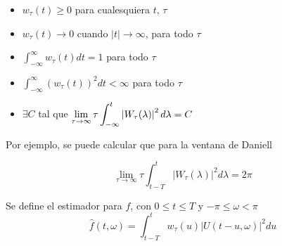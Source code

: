 \begin{itemize}
\item $w_{\tau}(t) \geq 0$ para cualesquiera $t$, $\tau$
\item $w_{\tau}(t) \rightarrow 0$ cuando $\lvert t \lvert \rightarrow \infty$, para todo $\tau$
\item $\displaystyle \int_{-\infty}^{\infty} w_{\tau}(t) dt = 1$ para todo $\tau$
\item $\displaystyle \int_{-\infty}^{\infty} \left( w_{\tau}(t) \right)^{2} dt < \infty$ para todo $\tau$
\item $\exists C$ tal que  
$\displaystyle \lim_{\tau\rightarrow\infty} \tau \int_{-\infty}^{t} \left|  W_{\tau}(\lambda)  \right|^{2} d\lambda = C$
\end{itemize}


%

Por ejemplo, se puede calcular que para la ventana de Daniell

$$\lim_{\tau\rightarrow\infty} \tau \int_{t-T}^{t} \lvert W_{\tau}(\lambda) \lvert^{2} d\lambda = 2\pi$$


Se define el estimador para $f$, con $0 \leq t \leq T$ y $-\pi \leq \omega < \pi$
\begin{equation*}
\widehat{f}(t,\omega) = \int_{t-T}^{t} w_{\tau}(u) \lvert U(t-u,\omega) \lvert^{2} du
\label{estimador_doble_ventana}
\end{equation*}

